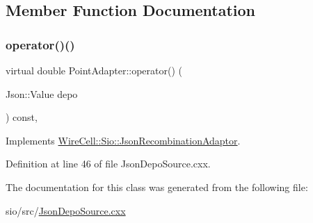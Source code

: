 \subsection{Member Function Documentation}
\mbox{\label{class_point_adapter_a37a981e5af75e1d513658dcbb1e35eb3}} 
\subsubsection{\texorpdfstring{operator()()}{operator()()}}
{\footnotesize\ttfamily virtual double Point\+Adapter\+::operator() (\begin{DoxyParamCaption}\item[{Json\+::\+Value}]{depo }\end{DoxyParamCaption}) const\hspace{0.3cm}{\ttfamily [inline]}, {\ttfamily [virtual]}}



Implements \hyperlink{class_sio_1_1_json_recombination_adaptor_abb1bebe500df507e3e9662e0026b7025}{Wire\+Cell\+::\+Sio\+::\+Json\+Recombination\+Adaptor}.



Definition at line 46 of file Json\+Depo\+Source.\+cxx.



The documentation for this class was generated from the following file\+:\begin{DoxyCompactItemize}
\item 
sio/src/\hyperlink{_json_depo_source_8cxx}{Json\+Depo\+Source.\+cxx}\end{DoxyCompactItemize}
